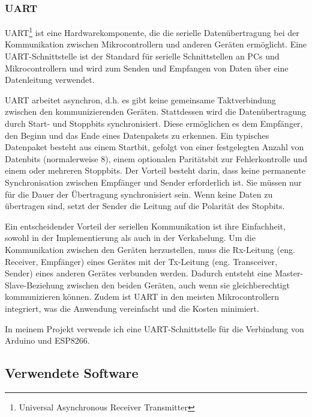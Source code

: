 \documentclass[12pt, letterpaper]{article}
\begin{document}
\subsubsection{UART}
\par UART\footnote[2]{Universal Asynchronous Receiver Transmitter} ist eine Hardwarekomponente, die die serielle Datenübertragung bei der Kommunikation zwischen Mikrocontrollern und anderen Geräten ermöglicht. Eine UART-Schnittstelle ist der Standard für serielle Schnittstellen an PCs und Mikrocontrollern und wird zum Senden und Empfangen von Daten über eine Datenleitung verwendet.
\par UART arbeitet asynchron, d.h. es gibt keine gemeinsame Taktverbindung zwischen den kommunizierenden Geräten. Stattdessen wird die Datenübertragung durch Start- und Stoppbits synchronisiert. Diese ermöglichen es dem Empfänger, den Beginn und das Ende eines Datenpakets zu erkennen. Ein typisches Datenpaket besteht aus einem Startbit, gefolgt von einer festgelegten Anzahl von Datenbits (normalerweise 8), einem optionalen Paritätsbit zur Fehlerkontrolle und einem oder mehreren Stoppbits. Der Vorteil besteht darin, dass keine permanente Synchronisation zwischen Empfänger und Sender erforderlich ist. Sie müssen nur für die Dauer der Übertragung synchronisiert sein. Wenn keine Daten zu übertragen sind, setzt der Sender die Leitung auf die Polarität des Stopbits.
\par Ein entscheidender Vorteil der seriellen Kommunikation ist ihre Einfachheit, sowohl in der Implementierung als auch in der Verkabelung. Um die Kommunikation zwischen den Geräten herzustellen, muss die Rx-Leitung (eng. Receiver, Empfänger) eines Gerätes mit der Tx-Leitung (eng. Transceiver, Sender) eines anderen Gerätes verbunden werden. Dadurch entsteht eine Master-Slave-Beziehung zwischen den beiden Geräten, auch wenn sie gleichberechtigt kommunizieren können. Zudem ist UART in den meisten Mikrocontrollern integriert, was die Anwendung vereinfacht und die Kosten minimiert.
\par In meinem Projekt verwende ich eine UART-Schnittstelle für die Verbindung von Arduino und ESP8266.
\subsection{Verwendete Software} 
\end{document}
